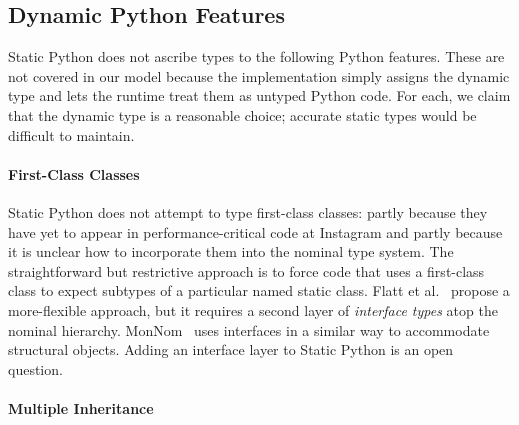 \documentclass[english,cleveref,submission]{programming}
\newcommand{\SP}{Static Python}
\begin{document}
\subsection{Dynamic Python Features}
\label{s:dynamic-python}


\SP{} does not ascribe types to the following Python features.
These are not covered in our model because the implementation simply
assigns the dynamic type and lets the runtime treat them as untyped
Python code.
For each, we claim that the dynamic type is a reasonable choice;
accurate static types would be difficult to maintain.


\paragraph{First-Class Classes}

\SP{} does not attempt to type first-class classes: partly because they have
yet to appear in performance-critical code at Instagram and partly because it
is unclear how to incorporate them into the nominal type system.
The straightforward but restrictive approach is to force code that uses a
first-class class to expect subtypes of a particular named static class.
Flatt et al.~\cite{fkf-popl-1998} propose a more-flexible approach, %
but it requires a second layer of \emph{interface types} atop the nominal hierarchy.
MonNom~\cite{mt-oopsla-2021} uses interfaces in a similar way to accommodate
structural objects.
Adding an interface layer to \SP{} is an open question.




\paragraph{Multiple Inheritance}
\end{document}
